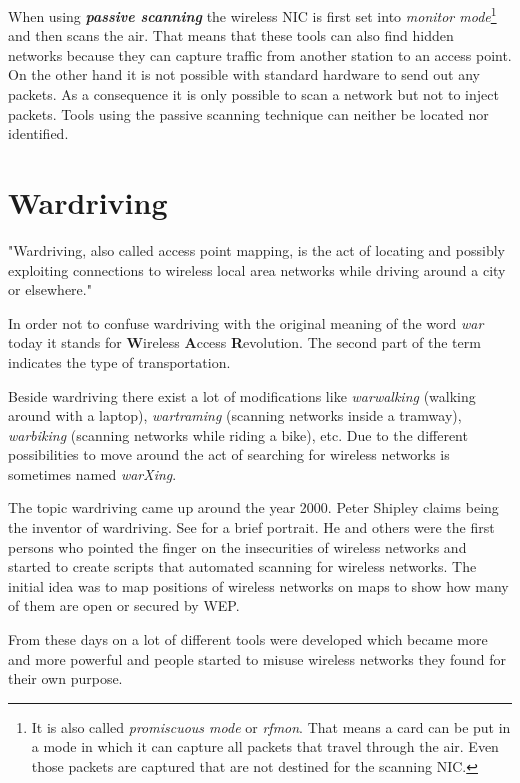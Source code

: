 When using {\bf {\em passive scanning}} the wireless NIC is first set into {\em monitor mode}\footnote{It is also called {\em promiscuous mode} or {\em rfmon}. That means a card can be put in a mode in which it can capture all packets that travel through the air. Even those packets are captured that are not destined for the scanning NIC.} and then scans the air. That means that these tools can also find hidden networks because they can capture traffic from another station to an access point. On the other hand it is not possible with standard hardware to send out any packets. As a consequence it is only possible to scan a network but not to inject packets. Tools using the passive scanning technique can neither be located nor identified.

\section{Wardriving}

"Wardriving, also called access point mapping, is the act of locating and possibly exploiting connections to wireless local area networks while driving around a city or elsewhere." \cite{wardrivingdef}

In order not to confuse wardriving with the original meaning of the word {\em war} today it stands for {\bf W}ireless {\bf A}ccess {\bf R}evolution. The second part of the term indicates the type of transportation. 

Beside wardriving there exist a lot of modifications like {\em warwalking} (walking around with a laptop), {\em wartraming} (scanning networks inside a tramway), {\em warbiking} (scanning networks while riding a bike), etc. Due to the different possibilities to move around the act of searching for wireless networks is sometimes named {\em warXing}.

The topic wardriving came up around the year 2000. Peter Shipley claims being the inventor of wardriving. See \cite{shipley} for a brief portrait. He and others were the first persons who pointed the finger on the insecurities of wireless networks and started to create scripts that automated scanning for wireless networks. The initial idea was to map positions of wireless networks on maps to show how many of them are open or secured by WEP.

From these days on a lot of different tools were developed which became more and more powerful and people started to misuse wireless networks they found for their own purpose.


